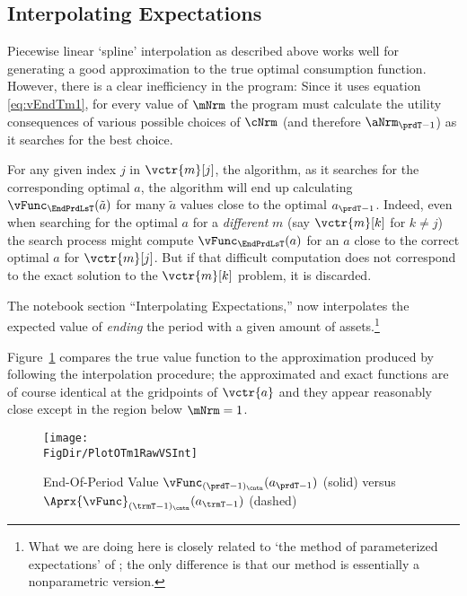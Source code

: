 \documentclass[\econtexRoot/SolvingMicroDSOPs]{subfiles}
\begin{document}
\hypertarget{interpolating-expectations}{}
\subsection{Interpolating Expectations}


Piecewise linear `spline' interpolation as described above works well for generating a good approximation to the true optimal consumption function. However, there is a clear inefficiency in the program: Since it uses equation \eqref{eq:vEndTm1}, for every value of $\mNrm$ the program must calculate the utility consequences of various possible choices of $\cNrm$ (and therefore $\aNrm_{\prdT-1}$) as it searches for the best choice.

For any given index $j$ in $\vctr{m}[j]$, the algorithm, as it searches for the corresponding optimal $a$, the algorithm will end up  calculating $\vFunc_{\EndPrdLsT}(\tilde{a})$ for many $\tilde{a}$ values close to the optimal $a_{\prdT-1}$.  Indeed, even when searching for the optimal $a$ for a \emph{different} $m$ (say $\vctr{m}[k]$ for $k \neq j$) the search process might compute $\vFunc_{\EndPrdLsT}(a)$ for an $a$ close to the correct optimal $a$ for $\vctr{m}[j]$. But if that difficult computation does not correspond to the exact solution to the $\vctr{m}[k]$ problem, it is discarded.  


The notebook section ``Interpolating Expectations,'' now interpolates the expected value of \textit{ending} the period with a given amount of assets.\footnote{What we are doing here is closely related to `the method of parameterized expectations' of \cite{denHaanMarcet:parameterized}; the only difference is that our method is essentially a nonparametric version.}  %

Figure~\ref{fig:PlotOTm1RawVSInt} compares the true value function to the approximation produced by following the interpolation procedure; the approximated and exact functions are of course identical at the gridpoints of $\vctr{a}$ and they appear reasonably close except in the region below $\mNrm=1$.

\hypertarget{PlotOTm1RawVSInt}{}
\begin{figure}
  \centerline{\texttt{[image: \\FigDir/PlotOTm1RawVSInt]}}
  \caption{End-Of-Period Value $\vFunc_{(\prdT-1)_\cntn}(a_{\prdT-1})$ (solid) versus $\Aprx{\vFunc}_{({\trmT-1})_\cntn}(a_{\trmT-1})$ (dashed)}
  \label{fig:PlotOTm1RawVSInt}
\end{figure}
\end{document}
